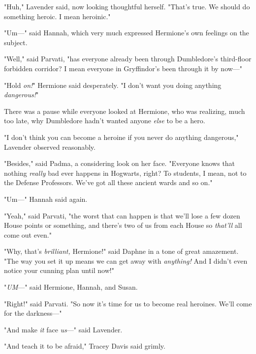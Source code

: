 "Huh," Lavender said, now looking thoughtful herself. "That's true. We should
do something heroic. I mean heroinic."

"Um\mbox{---}" said Hannah, which very much expressed Hermione's own feelings on the
subject.

"Well," said Parvati, "has everyone already been through Dumbledore's
third-floor forbidden corridor? I mean everyone in Gryffindor's been through it
by now\mbox{---}"

"Hold \emph{on!}" Hermione said desperately. "I don't want you doing anything
\emph{dangerous!}"

There was a pause while everyone looked at Hermione, who was realizing, much
too late, why Dumbledore hadn't wanted anyone \emph{else} to be a hero.

"I don't think you can become a heroine if you never do anything dangerous,"
Lavender observed reasonably.

"Besides," said Padma, a considering look on her face. "Everyone knows that
nothing \emph{really} bad ever happens in Hogwarts, right? To students, I mean,
not to the Defense Professors. We've got all these ancient wards and so on."

"Um\mbox{---}" Hannah said again.

"Yeah," said Parvati, "the worst that can happen is that we'll lose a few dozen
House points or something, and there's two of us from each House so
\emph{that'll} all come out even."

"Why, that's \emph{brilliant,} Hermione!" said Daphne in a tone of great
amazement. "The way you set it up means we can get away with \emph{anything!}
And I didn't even notice your cunning plan until now!"

"\emph{UM}\mbox{---}" said Hermione, Hannah, and Susan.

"Right!" said Parvati. "So now it's time for us to become real heroines. We'll
come for the darkness\mbox{---}"

"And make \emph{it} face \emph{us}\mbox{---}" said Lavender.

"And teach it to be afraid," Tracey Davis said grimly.
